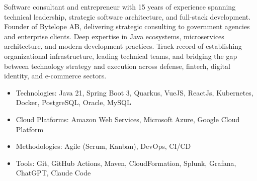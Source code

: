 \documentclass{resume}
\begin{document}
\noindent
\linebreak
Software consultant and entrepreneur with 15 years of experience spanning technical leadership, strategic software architecture, and full-stack development. Founder of Bytelope AB, delivering strategic consulting to government agencies and enterprise clients. Deep expertise in Java ecosystems, microservices architecture, and modern development practices. Track record of establishing organizational infrastructure, leading technical teams, and bridging the gap between technology strategy and execution across defense, fintech, digital identity, and e-commerce sectors.

\begin{itemize}
\item Technologies: Java 21, Spring Boot 3, Quarkus, VueJS, ReactJs, Kubernetes, Docker, PostgreSQL, Oracle, MySQL
\item Cloud Platforms: Amazon Web Services, Microsoft Azure, Google Cloud Platform
\item Methodologies: Agile (Scrum, Kanban), DevOps, CI/CD
\item Tools: Git, GitHub Actions, Maven, CloudFormation, Splunk, Grafana, ChatGPT, Claude Code
\end{itemize}
\end{document}
